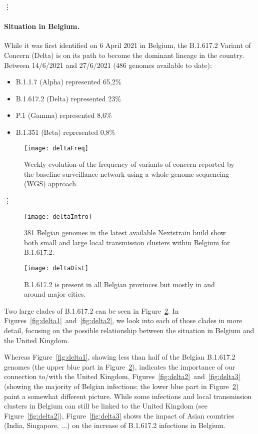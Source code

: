 \vdots

\paragraph*{Situation in Belgium.}
While it was first identified on 6 April 2021 in Belgium, the B.1.617.2 Variant of Concern (Delta) is on its path to become the dominant lineage in the country.
Between 14/6/2021 and 27/6/2021 (486 genomes available to date):
\begin{itemize}
  \item B.1.1.7 (Alpha) represented 65,2\%
  \item B.1.617.2 (Delta) represented 23\%
  \item P.1 (Gamma) represented 8,6\%
  \item B.1.351 (Beta) represented 0,8\%
\end{itemize}

\begin{figure}[ht]
  \centering
  \texttt{[image: deltaFreq]}
  \caption[Weekly VOCs as of 2021-06-21]{Weekly evolution of the frequency of variants of concern reported by the baseline surveillance network using a whole genome sequencing (WGS) approach.}
  \label{fig:deltaFreq}
\end{figure}

\vdots

\begin{figure}[ht]
  \centering
  \texttt{[image: deltaIntro]}
  \caption[Introductions and local transmission of B.1.617.2]{381 Belgian genomes in the latest available Nextstrain build show both small and large local transmission clusters within Belgium for B.1.617.2.}
  \label{fig:deltaIntro}
\end{figure}

\begin{figure}[ht]
  \centering
  \texttt{[image: deltaDist]}
  \caption[Distribution of Belgian B.1.617.2 sequences]{B.1.617.2 is present in all Belgian provinces but mostly in and around major cities.}
  \label{fig:deltaDist}
\end{figure}

Two large clades of B.1.617.2 can be seen in Figure~\ref{fig:deltaIntro}. In Figures~\ref{fig:delta1}~and~\ref{fig:delta2}, we look into each of those clades in more detail, focusing on the possible relationship between the situation in Belgium and the United Kingdom.

Whereas Figure~\ref{fig:delta1}, showing less than half of the Belgian B.1.617.2 genomes (the upper blue part in Figure~\ref{fig:deltaIntro}), indicates the importance of our connection to/with the United Kingdom, Figures~\ref{fig:delta2}~and~\ref{fig:delta3} (showing the majority of Belgian infections; the lower blue part in Figure~\ref{fig:deltaIntro}) paint a somewhat different picture.
While some infections and local transmission clusters in Belgium can still be linked to the United Kingdom (see Figure~\ref{fig:delta2}), Figure~\ref{fig:delta3} shows the impact of Asian countries (India, Singapore, ...) on the increase of B.1.617.2 infections in Belgium.


